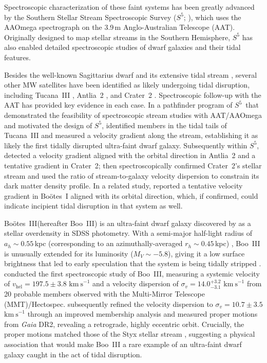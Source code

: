 \documentclass[twocolumn]{aastex631}
\newcommand{\SSSSS}{${S}^5$\xspace}
\newcommand{\gaia}{\textit{Gaia}\xspace}
\newcommand{\boo}{Bo\"{o}tes~III\xspace}
\newcommand{\vlosUnits}{$\mathrm{km~s}^{-1}$\xspace}
\begin{document}
Spectroscopic characterization of these faint systems has been greatly advanced by the Southern Stellar Stream Spectroscopic Survey (\SSSSS; \citealt{Li2019, Li2022}), which uses the AAOmega spectrograph \citep{Sharp2006} on the 3.9\,m Anglo-Australian Telescope (AAT). Originally designed to map stellar streams in the Southern Hemisphere, \SSSSS has also enabled detailed spectroscopic studies of dwarf galaxies and their tidal features.

Besides the well-known Sagittarius dwarf and its extensive tidal stream \citep{Vasiliev2021}, several other MW satellites have been identified as likely undergoing tidal disruption, including Tucana~III \citep{DrlicaWagner2015, Simon2017}, Antlia~2 \citep{Torrealba2019}, and Crater~2 \citep{Torrealba2016, Caldwell2017}. Spectroscopic follow-up with the AAT has provided key evidence in each case. In a pathfinder program of \SSSSS\ that demonstrated the feasibility of spectroscopic stream studies with AAT/AAOmega and motivated the design of \SSSSS, \citet{Li2018tucIII} identified members in the tidal tails of Tucana~III and measured a velocity gradient along the stream, establishing it as likely the first tidally disrupted ultra-faint dwarf galaxy. Subsequently within \SSSSS, \citet{Ji2021} detected a velocity gradient aligned with the orbital direction in Antlia~2 and a tentative gradient in Crater~2; \citet{Limberg2025} then spectroscopically confirmed Crater~2's stellar stream and used the ratio of stream-to-galaxy velocity dispersion to constrain its dark matter density profile. In a related study, \citet{Sandford2025} reported a tentative velocity gradient in Bo\"{o}tes~I aligned with its orbital direction, which, if confirmed, could indicate incipient tidal disruption in that system as well.

\boo (hereafter Boo~III) is an ultra-faint dwarf galaxy discovered by \citet{Grillmair2009} as a stellar overdensity in SDSS photometry. With a semi-major half-light radius of $a_h \sim 0.55$\,kpc (corresponding to an azimuthally-averaged $r_h \sim 0.45$\,kpc) \citep{Moskowitz2020}, Boo~III is unusually extended for its luminosity ($M_V \sim -5.8$), giving it a low surface brightness that led to early speculation that the system is being tidally stripped \citep{Carlin2009, Correnti2009}. \citet{Carlin2009} conducted the first spectroscopic study of Boo~III, measuring a systemic velocity of $v_{\mathrm{hel}} = 197.5 \pm 3.8$ \vlosUnits and a velocity dispersion of $\sigma_v = 14.0^{+3.2}_{-3.1}$ \vlosUnits from 20 probable members observed with the Multi-Mirror Telescope (MMT)/Hectospec. \citet{Carlin2018} subsequently refined the velocity dispersion to $\sigma_v = 10.7 \pm 3.5$ \vlosUnits through an improved membership analysis and measured proper motions from \gaia DR2, revealing a retrograde, highly eccentric orbit. Crucially, the proper motions matched those of the Styx stellar stream \citep{Grillmair2009}, suggesting a physical association that would make Boo~III a rare example of an ultra-faint dwarf galaxy caught in the act of tidal disruption.
\end{document}

